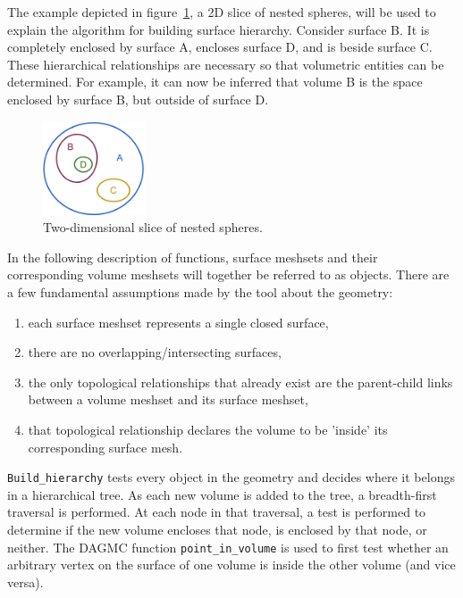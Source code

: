 \documentclass{anstrans}
\begin{document}
The example depicted in figure~\ref{fig:spheres}, a 2D slice of nested spheres, will 
be used to explain the algorithm for building surface hierarchy. Consider surface B.
It is completely enclosed by surface A, encloses surface D, and is beside surface C. 
These hierarchical relationships are necessary so that volumetric entities can be
determined.  For example, it can now be inferred that volume B is the space enclosed 
by surface B, but outside of surface D.

\begin{figure}[ht]
 \centering
 \includegraphics[width=0.27\textwidth]{../figs/nested_spheres.png}
 \caption{Two-dimensional slice of nested spheres.}
 \label{fig:spheres}
\end{figure}

In the following description of functions, surface meshsets and their corresponding volume meshsets will
together be referred to as objects.  
There are a few fundamental assumptions made by the tool about the geometry:
\begin{enumerate}
\item each surface meshset represents a single closed surface,
\item there are no overlapping/intersecting surfaces, 
\item the only topological relationships that already exist are the parent-child links between a volume meshset and its surface meshset, 
\item that topological relationship declares the volume to be 'inside' its corresponding surface mesh.
\end{enumerate}

\texttt{Build\_hierarchy} tests every object in the geometry and decides where
it belongs in a hierarchical tree.  As each new volume is added to the tree, a
breadth-first traversal is performed.  At each node in that traversal, a test
is performed to determine if the new volume encloses that node, is enclosed by
that node, or neither.  The DAGMC function \texttt{point\_in\_volume} is used
to first test whether an arbitrary vertex on the surface of one volume is
inside the other volume (and vice versa).
\end{document}
